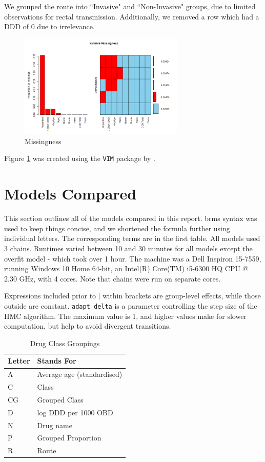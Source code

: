 \documentclass[11pt,twoside]{article}
\numberwithin{Theorem}{section}
\numberwithin{Definition}{section}
\numberwithin{Lemma}{section}
\numberwithin{Algorithm}{section}
\numberwithin{equation}{section}
\begin{document}
We grouped the route into ``Invasive" and ``Non-Invasive" groups, due to limited observations for rectal transmission. Additionally, we removed a row which had a DDD of 0 due to irrelevance.

\begin{figure}[h]
    \centering
    \includegraphics[width = 0.7\textwidth, height=0.25\textheight]{Figures/1_Missing.png}
    \caption{Missingness} \label{fig::Missingness}
\end{figure}

Figure \ref{fig::Missingness} was created using the \texttt{VIM} package by \cite{VIM}. 

\newpage

\section{Models Compared}
\label{app:ModelSpec}

This section outlines all of the models compared in this report. brms syntax was used to keep things concise, and we shortened the formula further using individual letters. The corresponding terms are in the first table. All models used 3 chains. Runtimes varied between 10 and 30 minutes for all models except the overfit model - which took over 1 hour. The machine was a Dell Inspiron 15-7559, running Windows 10 Home 64-bit, an Intel(R) Core(TM) i5-6300 HQ CPU @ 2.30 GHz, with 4 cores. Note that chains were run on separate cores. 

Expressions included prior to $|$ within brackets are group-level effects, while those outside are constant. \texttt{adapt\_delta} is a parameter controlling the step size of the HMC algorithm. The maximum value is 1, and higher values make for slower computation, but help to avoid divergent transitions. 


\begin{table}[h!]
	\centering
	\begin{tabular}{|l|l|}
		\hline
		Letter & Stands For \\ \hline
		A & Average age (standardised) \\
		C & Class\\
	    CG & Grouped Class \\
		D & log DDD per 1000 OBD \\
		N & Drug name \\
		P & Grouped Proportion \\
		R & Route \\ \hline
	\end{tabular} \caption{Drug Class Groupings}\label{table::acronyms}
\end{table}
\end{document}
